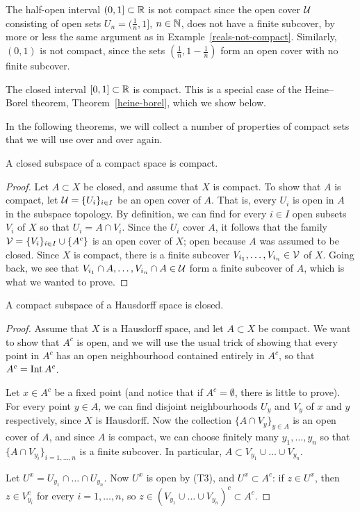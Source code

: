\begin{example}
  The half-open interval $(0,1] \subset \mathbb{R}$ is not compact since the open cover $\mathcal{U}$ consisting of open sets $U_n = (\tfrac{1}{n},1]$, $n \in \mathbb{N}$, does not have a finite subcover, by more or less the same argument as in Example~\ref{reals-not-compact}. Similarly, $(0,1)$ is not compact, since the sets $(\tfrac{1}{n},1-\tfrac{1}{n})$ form an open cover with no finite subcover.
\end{example}
\begin{example}
  \label{interval-compact}
  The closed interval $[0,1] \subset \mathbb{R}$ is compact. This is a special case of the Heine--Borel theorem, Theorem~\ref{heine-borel}, which we show below.
\end{example}
In the following theorems, we will collect a number of properties of compact sets that we will use over and over again.
\begin{thm}
  \label{closed-in-compact}
  A closed subspace of a compact space is compact.
\end{thm}
\begin{proof}
  Let $A \subset X$ be closed, and assume that $X$ is compact. To show that $A$ is compact, let $\mathcal{U} = \{U_i\}_{i \in I}$ be an open cover of $A$. That is, every $U_i$ is open in $A$ in the subspace topology. By definition, we can find for every $i \in I$ open subsets $V_i$ of $X$ so that $U_i = A \cap V_i$. Since the $U_i$ cover $A$, it follows that the family $\mathcal{V} = \{V_i\}_{i \in I} \cup \{A^c\}$ is an open cover of $X$; open because $A$ was assumed to be closed. Since $X$ is compact, there is a finite subcover $V_{i_1}, \dots, V_{i_n} \in \mathcal{V}$ of $X$. Going back, we see that $V_{i_1} \cap A, \dots, V_{i_n} \cap A \in \mathcal{U}$ form a finite subcover of $A$, which is what we wanted to prove.
\end{proof}
\begin{thm}
  \label{compact-in-Hausdorff}
  A compact subspace of a Hausdorff space is closed.
\end{thm}
\begin{proof}
  Assume that $X$ is a Hausdorff space, and let $A \subset X$ be compact. We want to show that $A^c$ is open, and we will use the usual trick of showing that every point in $A^c$ has an open neighbourhood contained entirely in $A^c$, so that $A^c = \operatorname{Int} A^c$.
  
  Let $x \in A^c$ be a fixed point (and notice that if $A^c = \emptyset$, there is little to prove). For every point $y \in A$, we can find disjoint neighbourhoods $U_y$ and $V_y$ of $x$ and $y$ respectively, since $X$ is Hausdorff. Now the collection $\{A \cap V_y\}_{y \in A}$ is an open cover of $A$, and since $A$ is compact, we can choose finitely many $y_1, \dots, y_n$ so that $\{A \cap V_{y_i}\}_{i=1,\dots,n}$ is a finite subcover. In particular, $A \subset V_{y_1} \cup \dots \cup V_{y_n}$.
  
  Let $U^x = U_{y_1} \cap \dots \cap U_{y_n}$. Now $U^x$ is open by (T3), and $U^x \subset A^c$: if $z \in U^x$, then $z \in V_{y_i}^c$ for every $i = 1, \dots, n$, so $z \in (V_{y_1} \cup \dots \cup V_{y_n})^c \subset A^c$.
\end{proof}
